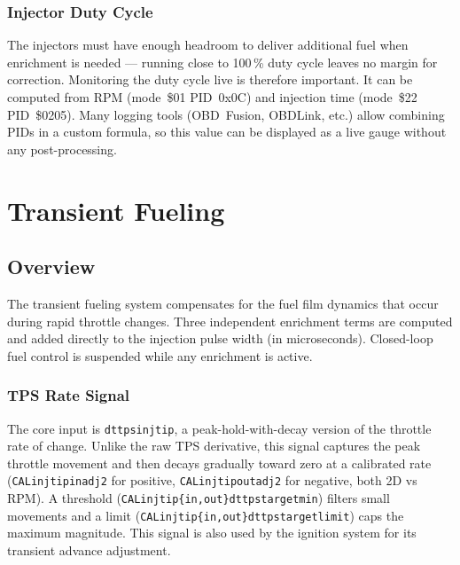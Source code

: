 \documentclass[a4paper,11pt]{article}
\renewcommand{\_}{\oldunderscore\allowbreak}
\begin{document}
\subsubsection*{Injector Duty Cycle}

The injectors must have enough headroom to deliver additional fuel when
enrichment is needed --- running close to 100\,\% duty cycle leaves no margin
for correction. Monitoring the duty cycle live is therefore important. It can be
computed from RPM (mode~\$01 PID~0x0C) and injection time
(mode~\$22 PID~\$0205). Many logging tools (OBD~Fusion, OBDLink, etc.) allow
combining PIDs in a custom formula, so this value can be displayed as a live
gauge without any post-processing.

\section{Transient Fueling}

\subsection{Overview}

The transient fueling system compensates for the fuel film dynamics that occur
during rapid throttle changes. Three independent enrichment terms are computed
and added directly to the injection pulse width (in microseconds). Closed-loop
fuel control is suspended while any enrichment is active.

\subsubsection*{TPS Rate Signal}

The core input is \texttt{dt\_tps\_injtip}, a peak-hold-with-decay version of
the throttle rate of change. Unlike the raw TPS derivative, this signal
captures the peak throttle movement and then decays gradually toward zero at a
calibrated rate (\texttt{CAL\_injtip\_in\_adj2} for positive,
\texttt{CAL\_injtip\_out\_adj2} for negative, both 2D vs RPM). A
threshold (\texttt{CAL\_injtip\_\{in,out\}\_dt\_tps\_target\_2\_min}) filters
small movements and a limit
(\texttt{CAL\_injtip\_\{in,out\}\_dt\_tps\_target\_2\_limit}) caps the maximum
magnitude. This
signal is also used by the ignition system for its transient advance
adjustment.
\end{document}
